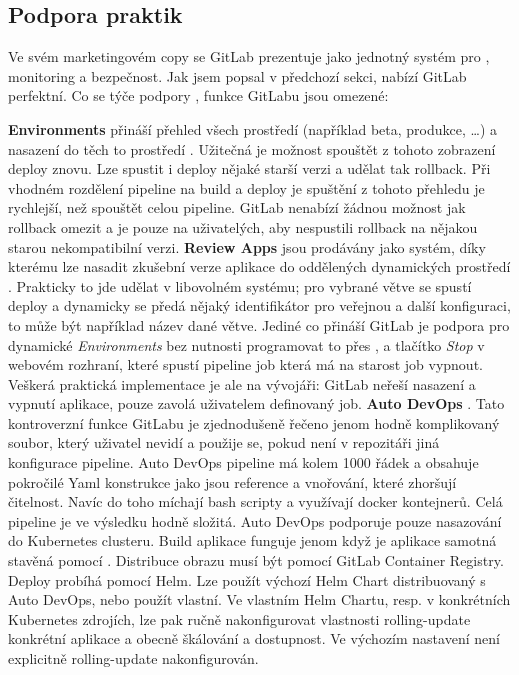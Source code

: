     \subsection{Podpora \CD praktik}
        Ve svém marketingovém copy se GitLab prezentuje jako jednotný systém pro \CICD, monitoring a bezpečnost. Jak jsem popsal v předchozí sekci, \CI nabízí GitLab perfektní. Co se týče podpory \CD, funkce GitLabu jsou omezené:

        \textbf{Environments} přináší přehled všech prostředí (například beta, produkce, \ldots) a nasazení do těch to prostředí \cite{gitlab-environments}. Užitečná je možnost spouštět z tohoto zobrazení deploy znovu. Lze spustit i deploy nějaké starší verzi a udělat tak rollback. Při vhodném rozdělení pipeline na build a deploy je spuštění z tohoto přehledu je rychlejší, než spouštět celou pipeline. GitLab nenabízí žádnou možnost jak rollback omezit a je pouze na uživatelých, aby nespustili rollback na nějakou starou nekompatibilní verzi.
        \textbf{Review Apps} jsou prodávány jako systém, díky kterému lze nasadit zkušební verze aplikace do oddělených dynamických prostředí \cite{gitlab-review-apps}. Prakticky to jde udělat v libovolném \CI systému; pro vybrané větve se spustí deploy a dynamicky se předá nějaký identifikátor pro veřejnou  a další konfiguraci, to může být například název dané větve. Jediné co přináší GitLab je podpora pro dynamické \textit{Environments} bez nutnosti programovat to přes , a tlačítko \textit{Stop} v webovém rozhraní, které spustí pipeline job která má na starost job vypnout. Veškerá praktická implementace je ale na vývojáři: GitLab neřeší nasazení a vypnutí aplikace, pouze zavolá uživatelem definovaný job.
        \textbf{Auto DevOps} \cite{gitlab-auto-devops}. Tato kontroverzní \cite{gitlab-auto-devops-forum} funkce GitLabu je zjednodušeně řečeno jenom hodně komplikovaný  soubor, který uživatel nevidí a použije se, pokud není v repozitáři jiná konfigurace pipeline. Auto DevOps pipeline má kolem 1000 řádek a obsahuje pokročilé Yaml konstrukce jako jsou reference a vnořování, které zhoršují čitelnost. Navíc do toho míchají bash scripty a využívají docker kontejnerů. Celá pipeline je ve výsledku hodně složitá. Auto DevOps podporuje pouze nasazování do Kubernetes clusteru. Build aplikace funguje jenom když je aplikace samotná stavěná pomocí . Distribuce obrazu musí být pomocí GitLab Container Registry. Deploy probíhá pomocí Helm. Lze použít výchozí Helm Chart distribuovaný s Auto DevOps, nebo použít vlastní. Ve vlastním Helm Chartu, resp. v konkrétních Kubernetes zdrojích, lze pak ručně nakonfigurovat vlastnosti rolling-update konkrétní aplikace a obecně škálování a dostupnost. Ve výchozím nastavení není explicitně rolling-update nakonfigurován.

